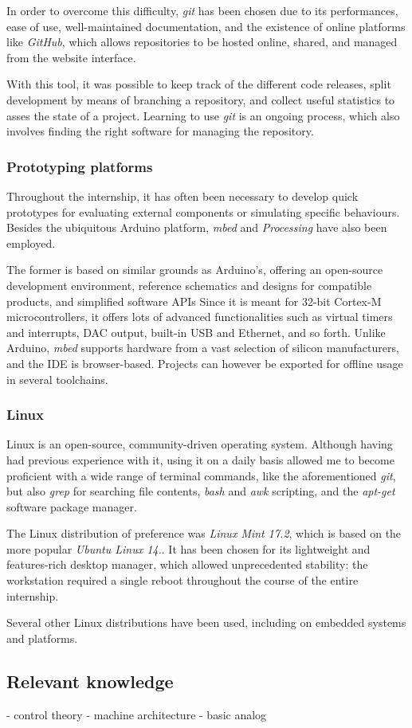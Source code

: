 In order to overcome this difficulty, \emph{git} has been chosen due to its performances, ease of use, well-maintained documentation, and the existence of online platforms like \emph{GitHub}, which allows repositories to be hosted online, shared, and managed from the website interface.

With this tool, it was possible to keep track of the different code releases, split development by means of branching a repository, and collect useful statistics to asses the state of a project.
Learning to use \emph{git} is an ongoing process, which also involves finding the right software for managing the repository.


\subsubsection{Prototyping platforms}
Throughout the internship, it has often been necessary to develop quick prototypes for evaluating external components or simulating specific behaviours.
Besides the ubiquitous Arduino platform, \emph{mbed} and \emph{Processing} have also been employed.

The former is based on similar grounds as Arduino's, offering an open-source development environment, reference schematics and designs for compatible products, and simplified software APIs
Since it is meant for 32-bit Cortex-M microcontrollers, it offers lots of advanced functionalities such as virtual timers and interrupts, DAC output, built-in USB and Ethernet, and so forth.
Unlike Arduino, \emph{mbed} supports hardware from a vast selection of silicon manufacturers, and the IDE is browser-based. 
Projects can however be exported for offline usage in several toolchains.


\subsubsection{Linux}
Linux is an open-source, community-driven operating system.
Although having had previous experience with it, using it on a daily basis allowed me to become proficient with a wide range of terminal commands, like the aforementioned \emph{git}, but also \emph{grep} for searching file contents, \emph{bash} and \emph{awk} scripting, and the \emph{apt-get} software package manager.

The Linux distribution of preference was \emph{Linux Mint 17.2}, which is based on the more popular \emph{Ubuntu Linux 14.}.
It has been chosen for its lightweight and features-rich desktop manager, which allowed unprecedented stability: the workstation required a single reboot throughout the course of the entire internship.

Several other Linux distributions have been used, including on embedded systems and platforms.


\subsection{Relevant knowledge}

- control theory
- machine architecture
- basic analog